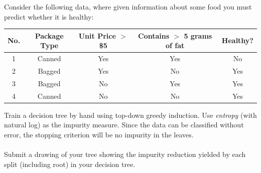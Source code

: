 \problem[7] Consider the following data, where given information about some food you must
predict whether it is healthy:
\noindent
\begin{table}[H]
\centering
\begin{tabular}{c | c c c | c}
\hline
No. & Package Type & Unit Price $>$ \$5 & Contains $>$ 5 grams of fat & Healthy? \\ \hline
1 & Canned & Yes & Yes & No \\
2 & Bagged & Yes & No & Yes \\
3 & Bagged & No & Yes & Yes \\
4 & Canned & No & No & Yes \\ \hline
\end{tabular}
\end{table}
\noindent
Train a decision tree by hand using top-down greedy induction. Use \textit{entropy} (with natural log) as the impurity measure. Since the data can be classified without error, the stopping criterion will be no impurity in the leaves.\\
\\
Submit a drawing of your tree showing the impurity reduction yielded by each split (including root) in your decision tree.
